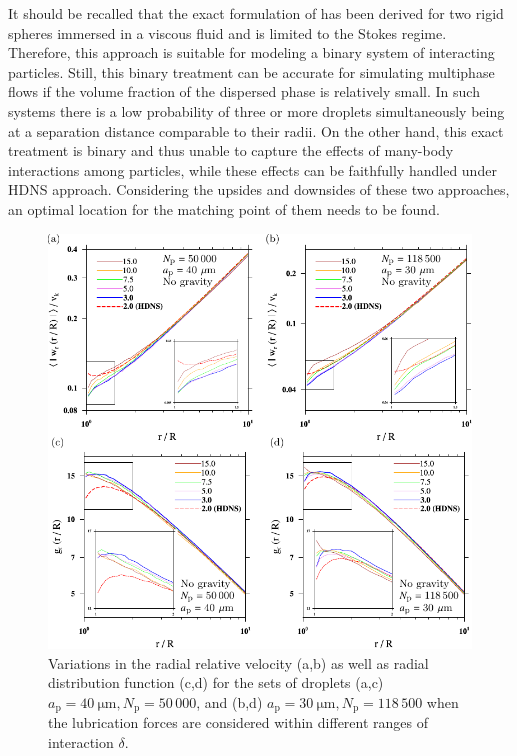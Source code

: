 \documentclass[../thesis.tex]{subfiles}
\begin{document}
It should be recalled that the exact formulation of \citet{JO84} has been derived for two rigid spheres immersed in a viscous fluid and is limited to the Stokes regime. Therefore, this approach is suitable for modeling a binary system of interacting particles. Still, this binary treatment can be accurate for simulating multiphase flows if the volume fraction of the dispersed phase is relatively small. In such systems there is a low probability of three or more droplets simultaneously being at a separation distance comparable to their radii. On the other hand, this exact treatment is binary and thus unable to capture the effects of many-body interactions among particles, while these effects can be faithfully handled under HDNS approach. Considering the upsides and downsides of these two approaches, an optimal location for the matching point of them needs to be found.

\begin{figure}%
\center
\includegraphics[width=\textwidth]{../figs/JFM/fig7.pdf}
\caption{Variations in the radial relative velocity (a,b) as well as radial distribution function (c,d) for the sets of droplets (a,c) $a_\mathrm{p} = 40~\mathrm{\mu m}, N_\mathrm{p} = 50\,000$, and (b,d) $a_\mathrm{p} = 30~\mathrm{\mu m}, N_\mathrm{p} = 118\,500$ when the lubrication forces are considered within different ranges of interaction $\delta$.}
\label{Fig7}
\end{figure}%
\end{document}
